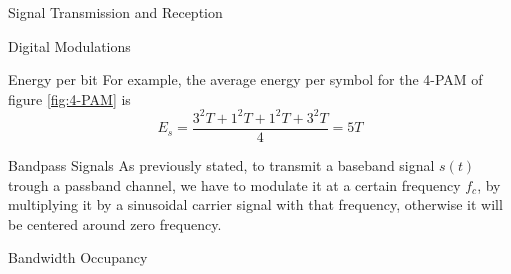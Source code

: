 \begin{section}{Signal Transmission and Reception}
\begin{subsection}{Digital Modulations}
\begin{subsubsection}{Energy per bit}
      For example, the average energy per symbol for the 4-PAM of figure \ref{fig:4-PAM} is
      \begin{equation}
        E_s=\frac{3^2T+1^2T+1^2T+3^2T}{4}=5T
      \end{equation}
      \begin{subsubsection}{Bandpass Signals}
        As previously stated, to transmit a baseband signal $s(t)$ trough a passband channel, we 
        have to modulate it at a certain frequency $f_c$, by multiplying it by a sinusoidal carrier
        signal with that frequency, otherwise it will be centered around zero frequency.\\
      \end{subsubsection}
      \begin{subsubsection}{Bandwidth Occupancy}
        \end{subsubsection}

    \end{subsubsection}


    
  \end{subsection}
\end{section}
